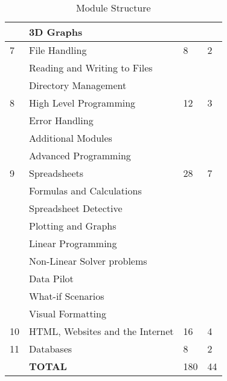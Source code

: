 \begin{table}[!h]
\begin{tabular}{|p{1.4cm}|l|p{2cm}|p{2cm}|}
                    & \qquad 3D Graphs                          &    &   \\
                 \hline
                 7  & File Handling                             & 8  & 2 \\
                    & \qquad Reading and Writing to Files       &    &   \\                 
                    & \qquad Directory Management               &    &   \\
                 \hline
                 8  & High Level Programming                    & 12 & 3 \\
                    & \qquad Error Handling                     &    &   \\
                    & \qquad Additional Modules                 &    &   \\    
                    & \qquad Advanced Programming               &    &   \\
                 \hline
                 9  & Spreadsheets                              & 28 & 7 \\
                    & \qquad Formulas and Calculations          &    &   \\
                    & \qquad Spreadsheet Detective              &    &   \\
                    & \qquad Plotting and Graphs                &    &   \\
                    & \qquad Linear Programming                 &    &   \\
                    & \qquad Non-Linear Solver problems         &    &   \\
                    & \qquad Data Pilot                         &    &   \\
                    & \qquad What-if Scenarios                  &    &   \\
                    & \qquad Visual Formatting                  &    &   \\
                 \hline
                 10 & HTML, Websites and the Internet           & 16 & 4 \\
                 \hline
                 11 & Databases                                 & 8  & 2 \\
                 \hline
                    & {\bf TOTAL}                               &180 &44 \\
                 \hline
             \end{tabular}
             \caption{Module Structure}
        \end{table}
        

